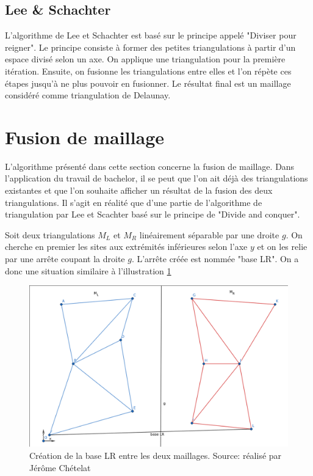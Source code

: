 \subsection{Lee \& Schachter}

L'algorithme de Lee et Schachter est basé sur le principe appelé "Diviser pour reigner".
Le principe consiste à former des petites triangulations à partir d'un espace divisé selon un axe.
On applique une triangulation pour la première itération.
Ensuite, on fusionne les triangulations entre elles et l'on répète ces étapes jusqu'à ne plus pouvoir en fusionner.
Le résultat final est un maillage considéré comme triangulation de Delaunay. 
\newpage
\section{Fusion de maillage}

L'algorithme présenté dans cette section concerne la fusion de maillage.
Dans l'application du travail de bachelor, il se peut que l'on ait déjà des triangulations existantes et que l'on souhaite afficher un résultat de la fusion des deux triangulations.
Il s'agit en réalité que d'une partie de l'algorithme de triangulation par Lee et Scachter basé sur le principe de "Divide and conquer".

Soit deux triangulations $M_L$ et $M_R$ linéairement séparable par une droite $g$.
On cherche en premier les sites aux extrémités inférieures selon l'axe $y$ et on les relie par une arrête coupant la droite $g$.
L'arrête créée est nommée "base LR". On a donc une situation similaire à l'illustration \ref{fig:base_lr}

\begin{figure}[!htb]
    \centering
    \includegraphics[width=0.8\linewidth]{figures/base_lr.png}
    \caption{Création de la base LR entre les deux maillages. Source: réalisé par Jérôme Chételat}
    \label{fig:base_lr}
\end{figure}

